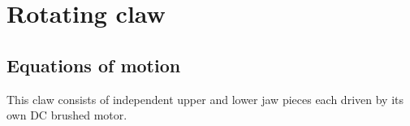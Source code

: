 \section{Rotating claw}

\subsection{Equations of motion}

This claw consists of independent upper and lower jaw pieces each driven by its
own DC brushed motor.
